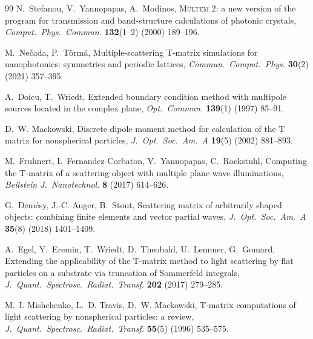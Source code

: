 \documentclass[11pt,a4paper]{article}
\theoremstyle{plain}
\theoremstyle{definition}
\begin{document}
\begin{thebibliography}{99}
N.~Stefanou, V.~Yannopapas, A.~Modinos,
\newblock \textsc{Multem 2}: a new version of the program for transmission and
band-structure calculations of photonic crystals,
\newblock \emph{Comput.\ Phys.\ Commun.} \textbf{132}(1--2) (2000) 189--196.

M.~Ne\v{c}ada, P.~T\"orm\"a,
\newblock Multiple-scattering T-matrix simulations for nanophotonics: symmetries
and periodic lattices,
\newblock \emph{Commun.\ Comput.\ Phys.} \textbf{30}(2) (2021) 357--395.

A.~Doicu, T.~Wriedt,
\newblock Extended boundary condition method with multipole sources located in
the complex plane,
\newblock \emph{Opt.\ Commun.} \textbf{139}(1) (1997) 85--91.

D.~W. Mackowski,
\newblock Discrete dipole moment method for calculation of the T matrix for
nonspherical particles,
\newblock \emph{J.\ Opt.\ Soc.\ Am.\ A} \textbf{19}(5) (2002) 881--893.

M.~Fruhnert, I.~Fernandez-Corbaton, V.~Yannopapas, C.~Rockstuhl,
\newblock Computing the T-matrix of a scattering object with multiple plane wave
illuminations,
\newblock \emph{Beilstein J.\ Nanotechnol.} \textbf{8} (2017) 614--626.

G.~Dem\'esy, J.-C. Auger, B.~Stout,
\newblock Scattering matrix of arbitrarily shaped objects: combining finite
elements and vector partial waves,
\newblock \emph{J.\ Opt.\ Soc.\ Am.\ A} \textbf{35}(8) (2018) 1401--1409.

A.~Egel, Y.~Eremin, T.~Wriedt, D.~Theobald, U.~Lemmer, G.~Gomard,
\newblock Extending the applicability of the T-matrix method to light scattering
by flat particles on a substrate via truncation of Sommerfeld integrals,
\newblock \emph{J.\ Quant.\ Spectrosc.\ Radiat.\ Transf.} \textbf{202} (2017)
279--285.

M.~I. Mishchenko, L.~D. Travis, D.~W. Mackowski,
\newblock T-matrix computations of light scattering by nonspherical particles: a
review,
\newblock \emph{J.\ Quant.\ Spectrosc.\ Radiat.\ Transf.} \textbf{55}(5) (1996)
535--575.

\end{thebibliography}
\end{document}
